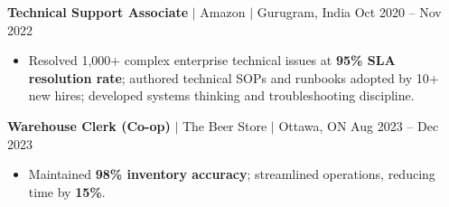 \documentclass[11pt,a4paper]{article}
\begin{document}
\textbf{Technical Support Associate} $|$ Amazon $|$ Gurugram, India \hfill Oct 2020 -- Nov 2022
\begin{itemize}
    \item Resolved 1,000+ complex enterprise technical issues at \textbf{95\% SLA resolution rate}; authored technical SOPs and runbooks adopted by 10+ new hires; developed systems thinking and troubleshooting discipline.
\end{itemize}

\vspace{4pt}

\textbf{Warehouse Clerk (Co-op)} $|$ The Beer Store $|$ Ottawa, ON \hfill Aug 2023 -- Dec 2023
\begin{itemize}
    \item Maintained \textbf{98\% inventory accuracy}; streamlined operations, reducing time by \textbf{15\%}.
\end{itemize}
\end{document}
